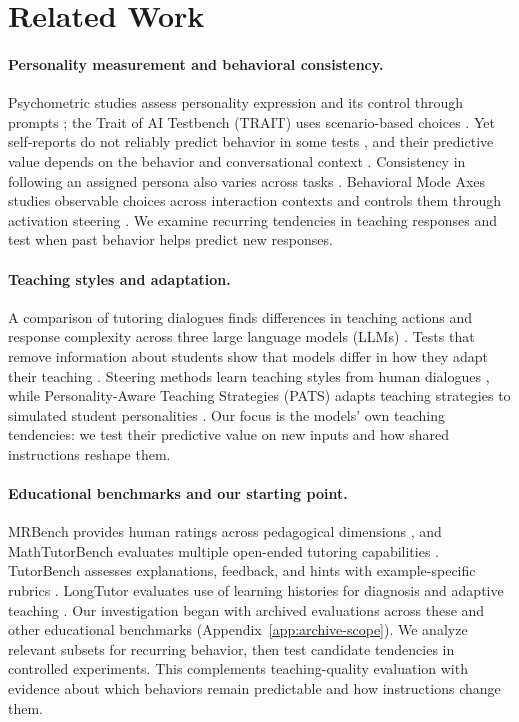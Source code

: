 \section{Related Work}

\paragraph{Personality measurement and behavioral consistency.}
Psychometric studies assess personality expression and its control through
prompts \citep{serapio2025psychometric}; the Trait of AI Testbench (TRAIT) uses
scenario-based choices \citep{lee2025trait}. Yet self-reports do not reliably
predict behavior in some tests \citep{han2026illusion}, and their predictive
value depends on the behavior and conversational context
\citep{kocielnik2026rethinking}. Consistency in following an assigned persona also varies across
tasks \citep{reusens2025consistency}. Behavioral Mode Axes studies observable
choices across interaction contexts and controls them through activation
steering \citep{liu2026bma}. We examine recurring tendencies in teaching
responses and test when past behavior helps predict new responses.

\paragraph{Teaching styles and adaptation.}
A comparison of tutoring dialogues finds differences in teaching actions and
response complexity across three large language models (LLMs)
\citep{kucheria2025cima}. Tests that remove information about students show that models differ in how
they adapt their teaching
\citep{borchers2025adaptivity}. Steering methods learn teaching styles
from human dialogues \citep{lee2026tutorpersonas}, while Personality-Aware
Teaching Strategies (PATS) adapts teaching
strategies to simulated student personalities \citep{rooein2026pats}.
Our focus is the models' own teaching tendencies: we test their predictive
value on new inputs and how shared instructions reshape them.

\paragraph{Educational benchmarks and our starting point.}
MRBench provides human ratings across pedagogical dimensions
\citep{maurya2025mrbench}, and MathTutorBench evaluates multiple open-ended
tutoring capabilities \citep{macina2025mathtutorbench}. TutorBench assesses
explanations, feedback, and hints with example-specific rubrics
\citep{srinivasa2025tutorbench}. LongTutor evaluates use of learning histories
for diagnosis and adaptive teaching \citep{li2026longtutor}.
Our investigation began with archived evaluations across these and other
educational benchmarks (Appendix~\ref{app:archive-scope}). We analyze relevant
subsets for recurring behavior, then test candidate tendencies in controlled
experiments. This complements teaching-quality evaluation with evidence about
which behaviors remain predictable and how instructions change them.
